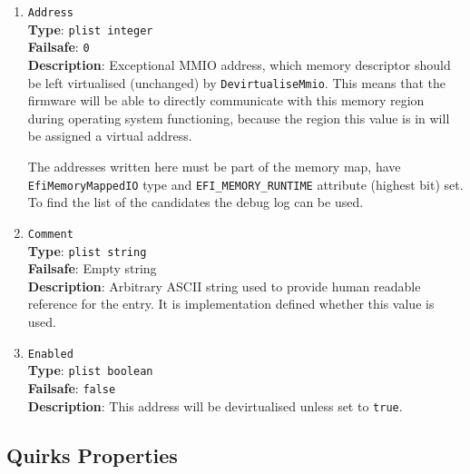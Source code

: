 \documentclass[]{article}
\begin{document}
\begin{enumerate}

\item
  \texttt{Address}\\
  \textbf{Type}: \texttt{plist\ integer}\\
  \textbf{Failsafe}: \texttt{0}\\
  \textbf{Description}: Exceptional MMIO address, which memory descriptor should be left
  virtualised (unchanged) by \texttt{DevirtualiseMmio}. This means that the firmware will
  be able to directly communicate with this memory region during operating system functioning,
  because the region this value is in will be assigned a virtual address.

  The addresses written here must be part of the memory map, have \texttt{EfiMemoryMappedIO}
  type and \texttt{EFI\_MEMORY\_RUNTIME} attribute (highest bit) set. To find the list of the
  candidates the debug log can be used.

\item
  \texttt{Comment}\\
  \textbf{Type}: \texttt{plist\ string}\\
  \textbf{Failsafe}: Empty string\\
  \textbf{Description}: Arbitrary ASCII string used to provide human readable
  reference for the entry. It is implementation defined whether this value is
  used.

\item
  \texttt{Enabled}\\
  \textbf{Type}: \texttt{plist\ boolean}\\
  \textbf{Failsafe}: \texttt{false}\\
  \textbf{Description}: This address will be devirtualised unless set to \texttt{true}.

\end{enumerate}

\subsection{Quirks Properties}\label{booterpropsquirks}
\end{document}
